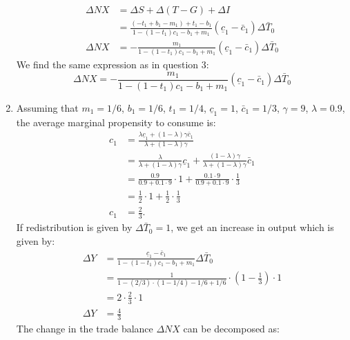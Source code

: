 \documentclass[]{book}
\begin{document}
\begin{enumerate}
\[\begin{aligned}
  \Delta NX &= \Delta S + \Delta (T-G) + \Delta I\\
  &=\frac{(-t_1+b_1-m_1) + t_1 - b_1}{1-\left(1-t_{1}\right)c_{1}-b_{1}+m_1}\left(\underline{c}_{1}-\bar{c}_{1}\right)\Delta\bar{T}_{0}\\
  \Delta NX &= - \frac{m_1}{1-\left(1-t_{1}\right)c_{1}-b_{1}+m_1}\left(\underline{c}_{1}-\bar{c}_{1}\right)\Delta\bar{T}_{0}
  \end{aligned}
  \] We find the same expression as in question 3:
  \[\boxed{\Delta NX = - \frac{m_1}{1-\left(1-t_{1}\right)c_{1}-b_{1}+m_1}\left(\underline{c}_{1}-\bar{c}_{1}\right)\Delta\bar{T}_{0}}\]
\item
  Assuming that \(m_1=1/6\), \(b_1=1/6\), \(t_1=1/4\),
  \(\underline{c}_{1}=1\), \(\bar{c}_{1}=1/3\), \(\gamma=9\),
  \(\lambda=0.9\), the average marginal propensity to consume is: \[
  \begin{aligned}
  c_1 &= \frac{\lambda\underline{c}_{1}+\left(1-\lambda\right)\gamma\bar{c}_{1}}{\lambda+(1-\lambda)\gamma}\\
   &= \frac{\lambda}{\lambda+(1-\lambda)\gamma}\underline{c}_{1} + \frac{\left(1-\lambda\right)\gamma}{\lambda+(1-\lambda)\gamma}\bar{c}_{1}\\
   &= \frac{0.9}{0.9+0.1 \cdot 9}\cdot 1 + \frac{0.1 \cdot 9}{0.9+0.1 \cdot 9}\cdot \frac{1}{3}\\
    &= \frac{1}{2}\cdot 1 + \frac{1}{2}\cdot \frac{1}{3}\\
  c_1 &= \frac{2}{3}.
  \end{aligned}
  \] If redistribution is given by \(\Delta \bar{T}_0 = 1\), we get an
  increase in output which is given by: \[
  \begin{aligned}
  \Delta Y &= \frac{\underline{c}_{1}-\bar{c}_{1}}{1-\left(1-t_{1}\right)c_{1}-b_{1}+m_1}\Delta\bar{T}_{0}\\
  &=\frac{1}{1-(2/3) \cdot (1- 1/4)-1/6+1/6} \cdot \left(1-\frac{1}{3}\right) \cdot 1\\
  &= 2 \cdot \frac{2}{3} \cdot 1\\
  \Delta Y &= \frac{4}{3}
  \end{aligned}
  \] The change in the trade balance \(\Delta NX\) can be decomposed as:
\end{enumerate}
\end{document}
